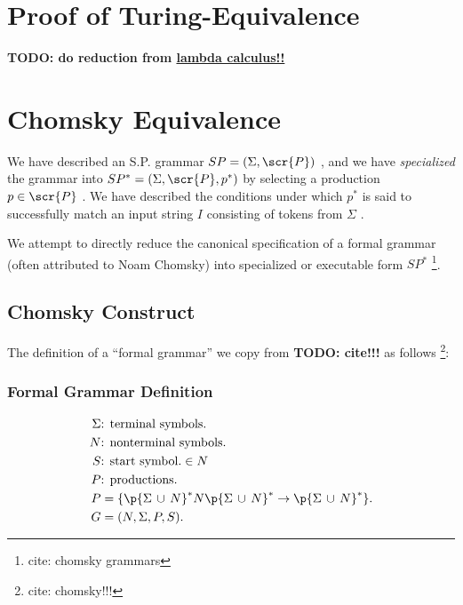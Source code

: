 \documentclass[10pt]{article}
\newcommand{\todocite}[1]{\footnote{cite: #1}}
\begin{document}
\section{Proof of Turing-Equivalence}
\label{sec:proof-of-turing-equivalence}

\textbf{TODO: do reduction from \href{https://en.wikipedia.org/wiki/Lambda_calculus}{lambda calculus!!}}

\section{Chomsky Equivalence}
\label{sec:chomsky-equivalence}
We have described an S.P. grammar $SP = (\Sigma, \scr{P})$ , and we have \textit{specialized} the grammar into $SP^* = (\Sigma, \scr{P}, p^*)$ by selecting a production $p \in \scr{P}$ . We have described the conditions under which $p^*$ is said to successfully match an input string $I$ consisting of tokens from $\Sigma$ .

We attempt to directly reduce the canonical specification of a formal grammar (often attributed to Noam Chomsky) into specialized or executable form $SP^*$ \todocite{chomsky grammars}.

\subsection{Chomsky Construct}
\label{sec:chomsky-construct}
The definition of a ``formal grammar'' we copy from \textbf{TODO: cite!!!} as follows \todocite{chomsky!!!}:

\subsubsection{Formal Grammar Definition}
\label{sec:formal-grammar-definition}
\begin{align}
  \label{eq:chomsky-production}
  \Sigma &\text{: terminal symbols.} \\
  N &\text{: nonterminal symbols.} \\
  S &\text{: start symbol.} \in N \\
  P &\text{: productions.} \\
  P &= \{\p{\Sigma\, \cup \, N}^* N \p{\Sigma\, \cup \, N}^* \rightarrow \p{\Sigma\, \cup \, N}^* \}. \\
  G &= (N, \Sigma, P, S).
\end{align}
\end{document}
